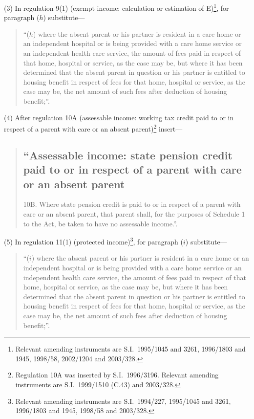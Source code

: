 \documentclass[12pt,a4paper]{article}
\begin{document}
(3) In regulation 9(1) (exempt income: calculation or estimation of E)\footnote{Relevant amending instruments are S.I.\ 1995/1045 and 3261, 1996/1803 and 1945, 1998/58, 2002/1204 and 2003/328.}, for paragraph ($h$)  substitute—
\begin{quotation}
“($h$) where the absent parent or his partner is resident in a care home or an independent hospital or is being provided with a care home service or an independent health care service, the amount of fees paid in respect of that home, hospital or service, as the case may be, but where it has been determined that the absent parent in question or his partner is entitled to housing benefit in respect of fees for that home, hospital or service, as the case may be, the net amount of such fees after deduction of housing benefit;”.
\end{quotation}

(4) After regulation 10A (assessable income: working tax credit paid to or in respect of a parent with care or an absent parent)\footnote{Regulation 10A was inserted by S.I.\ 1996/3196. Relevant amending instruments are S.I.\ 1999/1510 (C.43) and 2003/328.} insert—
\begin{quotation}
\subsection*{“Assessable income: state pension credit paid to or in respect of a parent with care or an absent parent}

10B.  Where state pension credit is paid to or in respect of a parent with care or an absent parent, that parent shall, for the purposes of Schedule 1 to the Act, be taken to have no assessable income.”.
\end{quotation}

(5) In regulation 11(1) (protected income)\footnote{Relevant amending instruments are S.I.\ 1994/227, 1995/1045 and 3261, 1996/1803 and 1945, 1998/58 and 2003/328.}, for paragraph ($i$)  substitute—
\begin{quotation}
“($i$) where the absent parent or his partner is resident in a care home or an independent hospital or is being provided with a care home service or an independent health care service, the amount of fees paid in respect of that home, hospital or service, as the case may be, but where it has been determined that the absent parent in question or his partner is entitled to housing benefit in respect of fees for that home, hospital or service, as the case may be, the net amount of such fees after deduction of housing benefit;”.
\end{quotation}
\end{document}
